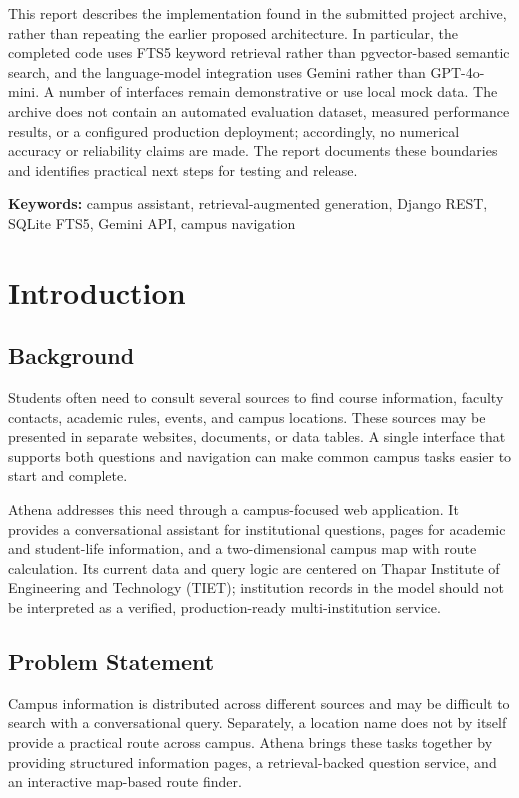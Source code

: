 \documentclass[11pt,a4paper]{report}
\begin{document}
This report describes the implementation found in the submitted project
archive, rather than repeating the earlier proposed architecture. In
particular, the completed code uses FTS5 keyword retrieval rather than
pgvector-based semantic search, and the language-model integration uses Gemini
rather than GPT-4o-mini. A number of interfaces remain demonstrative or use
local mock data. The archive does not contain an automated evaluation dataset,
measured performance results, or a configured production deployment;
accordingly, no numerical accuracy or reliability claims are made. The report
documents these boundaries and identifies practical next steps for testing and
release.

\textbf{Keywords:} campus assistant, retrieval-augmented generation, Django REST,
SQLite FTS5, Gemini API, campus navigation

\tableofcontents
\clearpage
{}

\chapter{Introduction}

\section{Background}
Students often need to consult several sources to find course information,
faculty contacts, academic rules, events, and campus locations. These sources
may be presented in separate websites, documents, or data tables. A single
interface that supports both questions and navigation can make common campus
tasks easier to start and complete.

Athena addresses this need through a campus-focused web application. It
provides a conversational assistant for institutional questions, pages for
academic and student-life information, and a two-dimensional campus map with
route calculation. Its current data and query logic are centered on Thapar
Institute of Engineering and Technology (TIET); institution records in the
model should not be interpreted as a verified, production-ready
multi-institution service.

\section{Problem Statement}
Campus information is distributed across different sources and may be
difficult to search with a conversational query. Separately, a location name
does not by itself provide a practical route across campus. Athena brings
these tasks together by providing structured information pages, a
 retrieval-backed question service, and an interactive map-based route finder.
\end{document}
